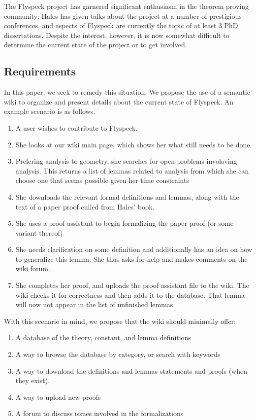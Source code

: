 The Flyspeck project has garnered significant enthusiasm in the theorem proving
community: Hales has given talks about the project at a number of
prestigious conferences, and aspects of Flyspeck are currently the topic of at least
3 PhD dissertations.  Despite the interest, however, it is now somewhat difficult to 
determine the current state of the project or to get involved.  



\subsection{Requirements}
In this paper, we seek to remedy this situation.  We propose the use of a 
semantic wiki to organize and present details about the current state of Flyspeck.
An example scenario is as follows.  

\begin{enumerate}  
\item A user wishes to contribute to Flyspeck. 
\item She looks at our wiki main page, which shows her what still needs to be done. 
\item Prefering analysis to geometry, she searches for open problems involoving analysis.  
  This returns a list of lemmas related to analysis from which she can choose one that 
  seems possible given her time constraints 
\item She downloads the relevant formal definitions and lemmas, along with the text 
  of a paper proof culled from Hales' book. 
\item She uses a proof assistant to begin formalizing the paper proof (or some variant thereof) 
\item She needs clarification on some definition and additionally has an idea on how to generalize this 
  lemma.  She thus asks for help and makes comments on the wiki forum.   
\item She completes her proof, and uploads the proof assistant file to the wiki. 
  The wiki checks it for correctness and then adds it to the database.  That lemma will 
  now not appear in the list of unfinished lemmas. 
\end{enumerate}  

With this scenario in mind, we propose that the wiki should minimally offer: 

\begin{enumerate}  
\item A database of the theory, constant, and lemma definitions 
\item A way to browse the database by category, or search with keywords 
\item A way to download the definitions and lemmas statements and proofs (when they exist).   
\item A way to upload new proofs 
\item A forum to discuss issues involved in the formalizations 
\end{enumerate}      
